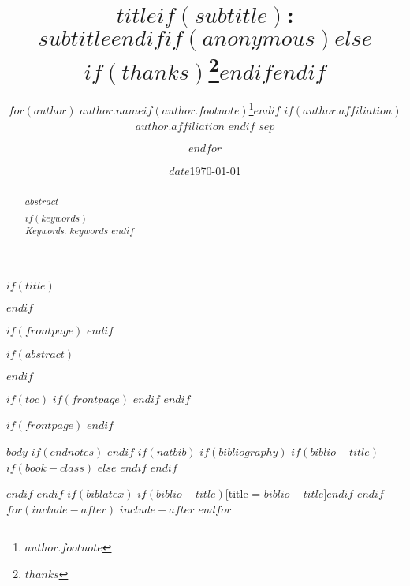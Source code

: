 \documentclass[
  $if(fontsize)$
    $fontsize$,
  $else$
    12pt,
  $endif$
  $if(lang)$
    $babel-lang$,
  $endif$
  $if(papersize)$
    $papersize$,
  $endif$
  $for(classoption)$
    $classoption$ $sep$,
  $endfor$]{article}
\title{$title$$if(subtitle)$: 
           \\ $subtitle$$endif$$if(anonymous)$$else$$if(thanks)$\thanks{$thanks$}$endif$$endif$}
\author{$for(author)$ %
            $author.name$$if(author.footnote)$\footnote{$author.footnote$}$endif$ $if(author.affiliation)$ \\ \emph{$author.affiliation$} $endif$
            $sep$ \and 
          $endfor$}
\date{$date$}
\date{\today}
\begin{document}
 


$if(title)$
  \maketitle
$endif$

$if(frontpage)$
$endif$


$if(abstract)$

  \begin{abstract}
    \noindent $abstract$ 

    $if(keywords)$ 
      \hfill \\ 
      \noindent \emph{Keywords}: $keywords$ 
    $endif$

  \end{abstract}

$endif$



$if(toc)$ 
  $if(frontpage)$
    \newpage
  $endif$
  \hypersetup{linkcolor = black}
  \setcounter{tocdepth}{$toc-depth$}
  \tableofcontents
$endif$





$if(frontpage)$
  \newpage
$endif$

\thispagestyle{empty}


\newpage

\onehalfspacing

\setcounter{page}{1}


$body$
$if(endnotes)$
  \newpage 
  \theendnotes
$endif$
\newpage
\singlespacing 
$if(natbib)$
  $if(bibliography)$
    $if(biblio-title)$
      $if(book-class)$
        \renewcommand\bibname{$biblio-title$} 
      $else$ 
        \renewcommand\refname{$biblio-title$} 
      $endif$ 
    $endif$
     
  $endif$ 
$endif$
$if(biblatex)$
  \printbibliography$if(biblio-title)$[title = $biblio-title$]$endif$ 
$endif$
$for(include-after)$ 
  $include-after$
$endfor$
\end{document}
